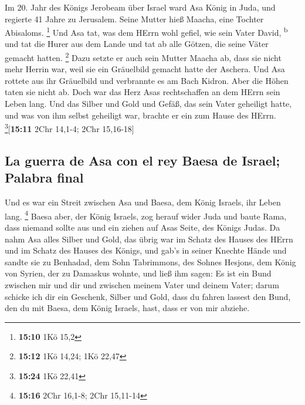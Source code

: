  Im 20. Jahr des Königs Jerobeam über Israel ward Asa
König in Juda,  und regierte 41 Jahre zu Jerusalem. Seine
Mutter hieß Maacha, eine Tochter Abisaloms. \footnote{\textbf{15:10} 1Kö
  15,2}  Und Asa tat, was dem HErrn wohl gefiel, wie sein
Vater David, \textsuperscript{b}  und tat die Hurer aus
dem Lande und tat ab alle Götzen, die seine Väter gemacht hatten.
\footnote{\textbf{15:12} 1Kö 14,24; 1Kö 22,47}  Dazu
setzte er auch sein Mutter Maacha ab, dass sie nicht mehr Herrin war,
weil sie ein Gräuelbild gemacht hatte der Aschera. Und Asa rottete aus
ihr Gräuelbild und verbrannte es am Bach Kidron.  Aber
die Höhen taten sie nicht ab. Doch war das Herz Asas rechtschaffen an
dem HErrn sein Leben lang.  Und das Silber und Gold und
Gefäß, das sein Vater geheiligt hatte, und was von ihm selbst geheiligt
war, brachte er ein zum Hause des HErrn. \footnote{\textbf{15:24} 1Kö
  22,41}{[}\textbf{15:11} 2Chr 14,1-4; 2Chr 15,16-18{]}

\hypertarget{la-guerra-de-asa-con-el-rey-baesa-de-israel-palabra-final}{%
\subsection{La guerra de Asa con el rey Baesa de Israel; Palabra
final}\label{la-guerra-de-asa-con-el-rey-baesa-de-israel-palabra-final}}

 Und es war ein Streit zwischen Asa und Baesa, dem König
Israels, ihr Leben lang. \footnote{\textbf{15:16} 2Chr 16,1-8; 2Chr
  15,11-14}  Baesa aber, der König Israels, zog herauf
wider Juda und baute Rama, dass niemand sollte aus und ein ziehen auf
Asas Seite, des Königs Judas.  Da nahm Asa alles Silber
und Gold, das übrig war im Schatz des Hauses des HErrn und im Schatz des
Hauses des Königs, und gab's in seiner Knechte Hände und sandte sie zu
Benhadad, dem Sohn Tabrimmons, des Sohnes Hesjons, dem König von Syrien,
der zu Damaskus wohnte, und ließ ihm sagen:  Es ist ein
Bund zwischen mir und dir und zwischen meinem Vater und deinem Vater;
darum schicke ich dir ein Geschenk, Silber und Gold, dass du fahren
lassest den Bund, den du mit Baesa, dem König Israels, hast, dass er von
mir abziehe.

